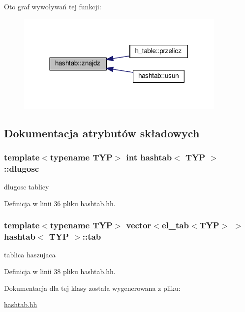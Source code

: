 Oto graf wywoływań tej funkcji\-:\nopagebreak
\begin{figure}[H]
\begin{center}
\leavevmode
\includegraphics[width=290pt]{classhashtab_af6452a7dbb4a30870ec16635b859f18c_icgraph}
\end{center}
\end{figure}




\subsection{Dokumentacja atrybutów składowych}
\hypertarget{classhashtab_a1c0fe6f05d425274c58352e21cc7f496}{
\subsubsection[{dlugosc}]{\setlength{\rightskip}{0pt plus 5cm}template$<$typename T\-Y\-P$>$ int {\bf hashtab}$<$ T\-Y\-P $>$\-::dlugosc\hspace{0.3cm}{\ttfamily [private]}}}\label{classhashtab_a1c0fe6f05d425274c58352e21cc7f496}


dlugosc tablicy 



Definicja w linii 36 pliku hashtab.\-hh.

\hypertarget{classhashtab_ab7d4d7c920e89fae8a292772dc9d7611}{
\subsubsection[{tab}]{\setlength{\rightskip}{0pt plus 5cm}template$<$typename T\-Y\-P$>$ vector$<${\bf el\-\_\-tab}$<$T\-Y\-P$>$ $>$ {\bf hashtab}$<$ T\-Y\-P $>$\-::tab\hspace{0.3cm}{\ttfamily [private]}}}\label{classhashtab_ab7d4d7c920e89fae8a292772dc9d7611}


tablica haszujaca 



Definicja w linii 38 pliku hashtab.\-hh.



Dokumentacja dla tej klasy została wygenerowana z pliku\-:\begin{DoxyCompactItemize}
\item 
\hyperlink{hashtab_8hh}{hashtab.\-hh}\end{DoxyCompactItemize}
